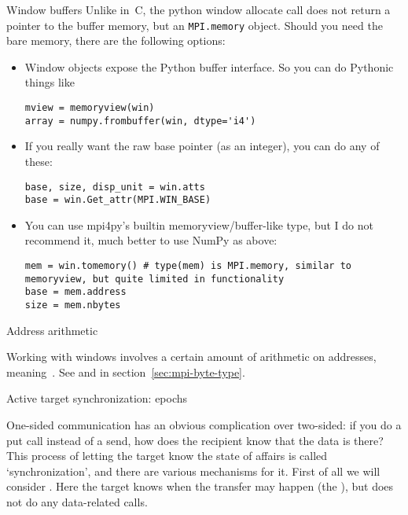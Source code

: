 \begin{pythonnote}{Window buffers}
  Unlike in~C, the python window allocate call does not return a pointer
  to the buffer memory, but an \lstinline+MPI.memory+ object.
  Should you need the bare memory, there are the following options:
  \begin{itemize}
  \item  Window objects expose the Python buffer interface. So you can do Pythonic things like
\begin{lstlisting}
mview = memoryview(win)
array = numpy.frombuffer(win, dtype='i4')
\end{lstlisting}
\item 
  If you really want the raw base pointer (as an integer), you can do any of these:
\begin{lstlisting}
base, size, disp_unit = win.atts
base = win.Get_attr(MPI.WIN_BASE)
\end{lstlisting}
\item You can use mpi4py's builtin memoryview/buffer-like type, but I
  do not recommend it, much better to use NumPy as above:
\begin{lstlisting}
mem = win.tomemory() # type(mem) is MPI.memory, similar to memoryview, but quite limited in functionality
base = mem.address
size = mem.nbytes
\end{lstlisting}
  \end{itemize}
\end{pythonnote}


 {Address arithmetic}

Working with windows involves a certain amount of arithmetic
on addresses, meaning~.
See  and 
in section~\ref{sec:mpi-byte-type}.


 {Active target synchronization: epochs}
\label{sec:fence}

One-sided communication has an obvious complication over two-sided: if
you do a put call instead of a send, how does the recipient know that
the data is there? This process of letting the target know the state
of affairs is called `synchronization', and there are various
mechanisms for it. First of all we will consider . Here the target knows when the transfer
may happen (the ), but does not do
any data-related calls.

